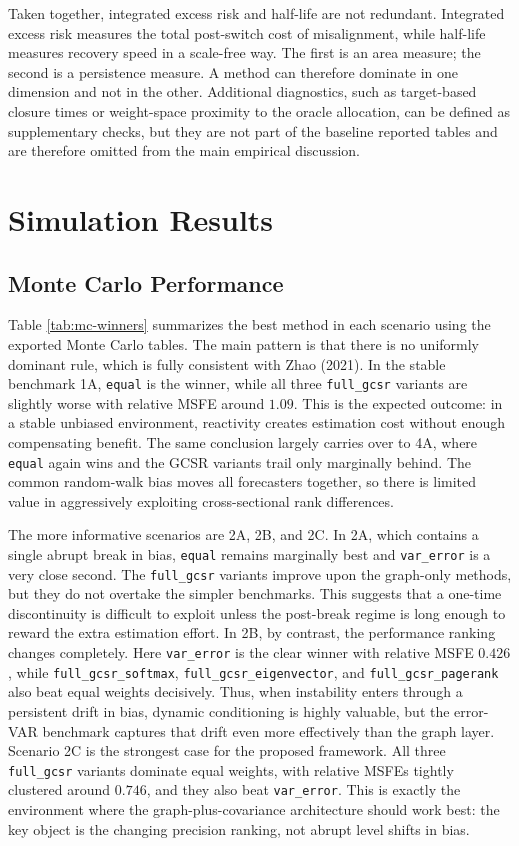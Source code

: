 \documentclass[11pt,a4paper]{article}
\begin{document}
Taken together, integrated excess risk and half-life are not redundant. Integrated excess risk measures the total post-switch cost of misalignment, while half-life measures recovery speed in a scale-free way. The first is an area measure; the second is a persistence measure. A method can therefore dominate in one dimension and not in the other. Additional diagnostics, such as target-based closure times or weight-space proximity to the oracle allocation, can be defined as supplementary checks, but they are not part of the baseline reported tables and are therefore omitted from the main empirical discussion.

\setcounter{section}{5}
\section{Simulation Results}

\subsection{Monte Carlo Performance}

Table \ref{tab:mc-winners} summarizes the best method in each scenario using the exported Monte Carlo tables. The main pattern is that there is no uniformly dominant rule, which is fully consistent with Zhao (2021). In the stable benchmark 1A, \texttt{equal} is the winner, while all three \texttt{full\_gcsr} variants are slightly worse with relative MSFE around $1.09$. This is the expected outcome: in a stable unbiased environment, reactivity creates estimation cost without enough compensating benefit. The same conclusion largely carries over to 4A, where \texttt{equal} again wins and the GCSR variants trail only marginally behind. The common random-walk bias moves all forecasters together, so there is limited value in aggressively exploiting cross-sectional rank differences.

The more informative scenarios are 2A, 2B, and 2C. In 2A, which contains a single abrupt break in bias, \texttt{equal} remains marginally best and \texttt{var\_error} is a very close second. The \texttt{full\_gcsr} variants improve upon the graph-only methods, but they do not overtake the simpler benchmarks. This suggests that a one-time discontinuity is difficult to exploit unless the post-break regime is long enough to reward the extra estimation effort. In 2B, by contrast, the performance ranking changes completely. Here \texttt{var\_error} is the clear winner with relative MSFE $0.426$, while \texttt{full\_gcsr\_softmax}, \texttt{full\_gcsr\_eigenvector}, and \texttt{full\_gcsr\_pagerank} also beat equal weights decisively. Thus, when instability enters through a persistent drift in bias, dynamic conditioning is highly valuable, but the error-VAR benchmark captures that drift even more effectively than the graph layer. Scenario 2C is the strongest case for the proposed framework. All three \texttt{full\_gcsr} variants dominate equal weights, with relative MSFEs tightly clustered around $0.746$, and they also beat \texttt{var\_error}. This is exactly the environment where the graph-plus-covariance architecture should work best: the key object is the changing precision ranking, not abrupt level shifts in bias.
\end{document}
